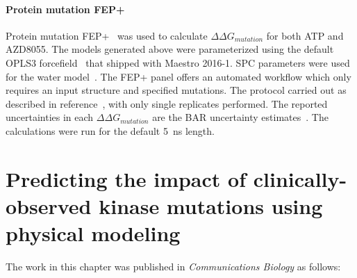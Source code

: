 \documentclass[phd,tocprelim]{cornell}
\begin{document}
\subsubsection{Protein mutation FEP+}
Protein mutation FEP+~\citep{Wang2015-cn,Hauser:2018vz,Abel:2017jt} was used to calculate $\Delta \Delta G_{mutation}$ for both ATP and AZD8055. The models generated above were parameterized using the default OPLS3 forcefield~\citep{Harder2016-zn} that shipped with Maestro 2016-1. SPC parameters were used for the water model~\citep{Berendsen:1981cq}. The FEP+ panel offers an automated workflow which only requires an input structure and specified mutations. The protocol carried out as described in reference~\cite{Hauser:2018vz}, with only single replicates performed. The reported uncertainties in each $\Delta \Delta G_{mutation}$ are the BAR uncertainty estimates~\citep{Bennett:1976gj,Shirts:2003cf}. The calculations were run for the default 5~ns length.

\chapter{Predicting the impact of clinically-observed kinase mutations using physical modeling}

The work in this chapter was published in \emph{Communications Biology} as follows: 
\realsinglespacing
{}
\realdoublespacing
 
\end{document}
